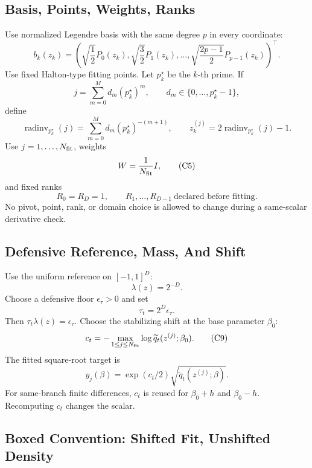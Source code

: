 \documentclass[11pt]{article}
\begin{document}
\subsection{Basis, Points, Weights, Ranks}

Use normalized Legendre basis with the same degree \(p\) in every coordinate:
\[
    b_k(z_k)=
    \left(
    \sqrt{\frac12}P_0(z_k),
    \sqrt{\frac32}P_1(z_k),
    \ldots,
    \sqrt{\frac{2p-1}{2}}P_{p-1}(z_k)
    \right)^\top.
    \tag{C3}
\]
Use fixed Halton-type fitting points.  Let \(p_k^\star\) be the \(k\)-th prime.
If
\[
    j=\sum_{m=0}^{M}d_m(p_k^\star)^m,\qquad
    d_m\in\{0,\ldots,p_k^\star-1\},
\]
define
\[
    \operatorname{radinv}_{p_k^\star}(j)
    =
    \sum_{m=0}^{M}d_m(p_k^\star)^{-(m+1)},
    \qquad
    z_k^{(j)}=2\operatorname{radinv}_{p_k^\star}(j)-1.
    \tag{C4}
\]
Use \(j=1,\ldots,N_{\rm fit}\), weights
\[
    W=\frac1{N_{\rm fit}}I,
    \tag{C5}
\]
and fixed ranks
\[
    R_0=R_D=1,\qquad R_1,\ldots,R_{D-1}\ \text{declared before fitting}.
    \tag{C6}
\]
No pivot, point, rank, or domain choice is allowed to change during a
same-scalar derivative check.

\subsection{Defensive Reference, Mass, And Shift}

Use the uniform reference on \([-1,1]^D\):
\[
    \lambda(z)=2^{-D}.
    \tag{C7}
\]
Choose a defensive floor \(\epsilon_\tau>0\) and set
\[
    \tau_t=2^D\epsilon_\tau.
    \tag{C8}
\]
Then \(\tau_t\lambda(z)=\epsilon_\tau\).  Choose the stabilizing shift at the
base parameter \(\beta_0\):
\[
    c_t=-\max_{1\le j\le N_{\rm fit}}
    \log \widetilde q_t(z^{(j)};\beta_0).
    \tag{C9}
\]
The fitted square-root target is
\[
    y_j(\beta)=\exp(c_t/2)\sqrt{\widetilde q_t(z^{(j)};\beta)}.
    \tag{C10}
\]
For same-branch finite differences, \(c_t\) is reused for
\(\beta_0+h\) and \(\beta_0-h\).  Recomputing \(c_t\) changes the scalar.

\subsection{Boxed Convention: Shifted Fit, Unshifted Density}
\end{document}
